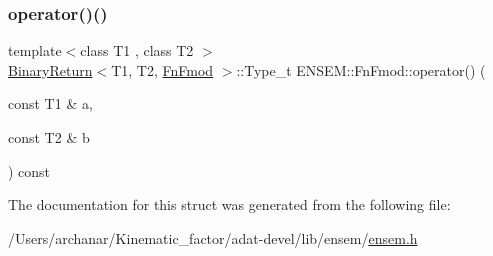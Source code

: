 \subsubsection{\texorpdfstring{operator()()}{operator()()}\hspace{0.1cm}{\footnotesize\ttfamily [3/3]}}
{\footnotesize\ttfamily template$<$class T1 , class T2 $>$ \\
\mbox{\hyperlink{structENSEM_1_1BinaryReturn}{Binary\+Return}}$<$T1, T2, \mbox{\hyperlink{structENSEM_1_1FnFmod}{Fn\+Fmod}} $>$\+::Type\+\_\+t E\+N\+S\+E\+M\+::\+Fn\+Fmod\+::operator() (\begin{DoxyParamCaption}\item[{const T1 \&}]{a,  }\item[{const T2 \&}]{b }\end{DoxyParamCaption}) const\hspace{0.3cm}{\ttfamily [inline]}}



The documentation for this struct was generated from the following file\+:\begin{DoxyCompactItemize}
\item 
/\+Users/archanar/\+Kinematic\+\_\+factor/adat-\/devel/lib/ensem/\mbox{\hyperlink{adat-devel_2lib_2ensem_2ensem_8h}{ensem.\+h}}\end{DoxyCompactItemize}
